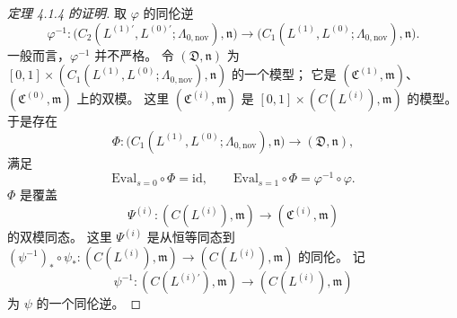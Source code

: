 \begin{proof}[定理 4.1.4 的证明]
取 $\varphi$ 的同伦逆
\[
\varphi^{-1}\colon
\bigl(C_2(L^{(1)\prime},L^{(0)\prime};
\Lambda_{0,\mathrm{nov}}),\mathfrak n\bigr)
\longrightarrow
\bigl(C_1(L^{(1)},L^{(0)};
\Lambda_{0,\mathrm{nov}}),\mathfrak n\bigr).
\]
一般而言，$\varphi^{-1}$ 并不严格。
令 $(\mathfrak D,\mathfrak n)$
为
$[0,1]\times
(C_1(L^{(1)},L^{(0)};
\Lambda_{0,\mathrm{nov}}),\mathfrak n)$
的一个模型；
它是
$(\mathfrak C^{(1)},\mathfrak m)$、
$(\mathfrak C^{(0)},\mathfrak m)$
上的双模。
这里
$(\mathfrak C^{(i)},\mathfrak m)$
是
$[0,1]\times
(C(L^{(i)}),\mathfrak m)$
的模型。
于是存在
\[
\Phi\colon
\bigl(
C_1(L^{(1)},L^{(0)};
\Lambda_{0,\mathrm{nov}}),\mathfrak n
\bigr)
\longrightarrow
(\mathfrak D,\mathfrak n),
\]
满足
\begin{equation}
\mathrm{Eval}_{s=0}\circ\Phi
=\mathrm{id},
\qquad
\mathrm{Eval}_{s=1}\circ\Phi
=\varphi^{-1}\circ\varphi.
\tag{5.3.69}\label{eq:5-3-69}
\end{equation}
$\Phi$ 是覆盖
\[
\Psi^{(i)}\colon
(C(L^{(i)}),\mathfrak m)
\longrightarrow
(\mathfrak C^{(i)},\mathfrak m)
\]
的双模同态。
这里 $\Psi^{(i)}$
是从恒等同态到
$(\psi^{-1})_*\circ\psi_*
\colon(C(L^{(i)}),\mathfrak m)
\to(C(L^{(i)}),\mathfrak m)$
的同伦。
记
\[
\psi^{-1}\colon
(C(L^{(i)\prime}),\mathfrak m)
\longrightarrow
(C(L^{(i)}),\mathfrak m)
\]
为 $\psi$ 的一个同伦逆。


\end{proof}
